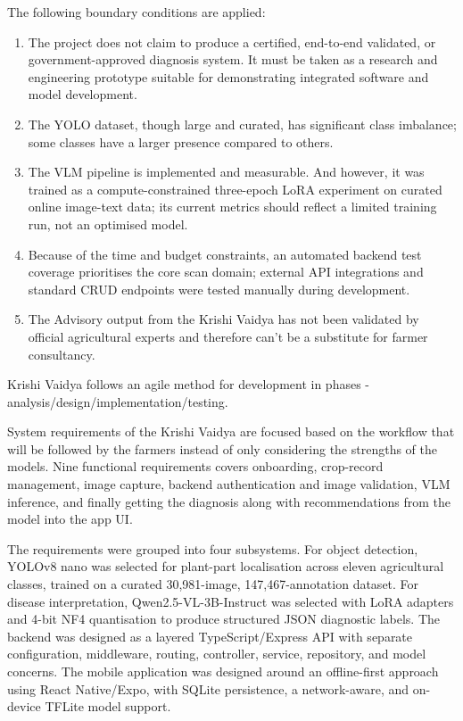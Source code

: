 The following boundary conditions are applied:

\begin{enumerate}[label=\arabic*.]
\item The project does not claim to produce a certified, end-to-end validated, or
government-approved diagnosis system. It must be taken as a research and engineering prototype suitable
for demonstrating integrated software and model development.


\item The YOLO dataset, though large and curated, has significant class imbalance; some classes have a larger presence compared to others.

\item The VLM pipeline is implemented and measurable. And however, it was trained as a compute-constrained three-epoch LoRA experiment on curated online image-text data; its current metrics should reflect a limited training run, not an optimised model.

\item Because of the time and budget constraints, an automated backend test coverage prioritises the core scan domain; external API integrations and standard CRUD endpoints were tested manually during development.

\item The Advisory output from the Krishi Vaidya has not been validated by official agricultural experts and therefore can't be a substitute for farmer consultancy.

\end{enumerate}


Krishi Vaidya follows an agile method for development in phases - analysis/design/implementation/testing.


System requirements of the Krishi Vaidya are focused based on the workflow that will be followed by the farmers instead of only considering the strengths of the models. Nine functional requirements covers onboarding, crop-record management, image capture, backend authentication and image validation, VLM inference, and finally getting the diagnosis along with recommendations from the model into the app UI.


The requirements were grouped into four subsystems. For object detection, YOLOv8 nano was selected for plant-part localisation across eleven agricultural classes, trained on a curated 30,981-image, 147,467-annotation dataset. For disease interpretation, Qwen2.5-VL-3B-Instruct was selected with LoRA adapters and 4-bit NF4 quantisation to produce structured JSON diagnostic labels. The backend was designed as a layered TypeScript/Express API with separate configuration, middleware, routing, controller, service, repository, and model concerns. The mobile application was designed around an offline-first approach using React Native/Expo, with SQLite persistence, a network-aware, and on-device TFLite model support.

